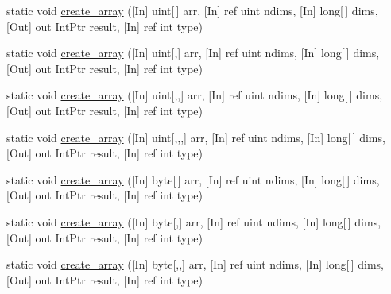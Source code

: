 \begin{DoxyCompactItemize}
\item 
static void \mbox{\hyperlink{classkhiva_1_1interop_1_1_d_l_l_array_ad44c8df121817c99bfd4b198a3634fc6}{create\+\_\+array}} (\mbox{[}In\mbox{]} uint\mbox{[}$\,$\mbox{]} arr, \mbox{[}In\mbox{]} ref uint ndims, \mbox{[}In\mbox{]} long\mbox{[}$\,$\mbox{]} dims, \mbox{[}Out\mbox{]} out Int\+Ptr result, \mbox{[}In\mbox{]} ref int type)
\item 
static void \mbox{\hyperlink{classkhiva_1_1interop_1_1_d_l_l_array_a64a55f5bfb3ad1a3a952d30d86101a7f}{create\+\_\+array}} (\mbox{[}In\mbox{]} uint\mbox{[},\mbox{]} arr, \mbox{[}In\mbox{]} ref uint ndims, \mbox{[}In\mbox{]} long\mbox{[}$\,$\mbox{]} dims, \mbox{[}Out\mbox{]} out Int\+Ptr result, \mbox{[}In\mbox{]} ref int type)
\item 
static void \mbox{\hyperlink{classkhiva_1_1interop_1_1_d_l_l_array_ab375d7195ded9e7835a23f548c1338be}{create\+\_\+array}} (\mbox{[}In\mbox{]} uint\mbox{[},,\mbox{]} arr, \mbox{[}In\mbox{]} ref uint ndims, \mbox{[}In\mbox{]} long\mbox{[}$\,$\mbox{]} dims, \mbox{[}Out\mbox{]} out Int\+Ptr result, \mbox{[}In\mbox{]} ref int type)
\item 
static void \mbox{\hyperlink{classkhiva_1_1interop_1_1_d_l_l_array_a5e309f5157241d17eba398f86a9abccc}{create\+\_\+array}} (\mbox{[}In\mbox{]} uint\mbox{[},,,\mbox{]} arr, \mbox{[}In\mbox{]} ref uint ndims, \mbox{[}In\mbox{]} long\mbox{[}$\,$\mbox{]} dims, \mbox{[}Out\mbox{]} out Int\+Ptr result, \mbox{[}In\mbox{]} ref int type)
\item 
static void \mbox{\hyperlink{classkhiva_1_1interop_1_1_d_l_l_array_abeb09bac96f36fd4554bfef73b24da11}{create\+\_\+array}} (\mbox{[}In\mbox{]} byte\mbox{[}$\,$\mbox{]} arr, \mbox{[}In\mbox{]} ref uint ndims, \mbox{[}In\mbox{]} long\mbox{[}$\,$\mbox{]} dims, \mbox{[}Out\mbox{]} out Int\+Ptr result, \mbox{[}In\mbox{]} ref int type)
\item 
static void \mbox{\hyperlink{classkhiva_1_1interop_1_1_d_l_l_array_a22615cf699595c8b74276e4eb6c7b4fc}{create\+\_\+array}} (\mbox{[}In\mbox{]} byte\mbox{[},\mbox{]} arr, \mbox{[}In\mbox{]} ref uint ndims, \mbox{[}In\mbox{]} long\mbox{[}$\,$\mbox{]} dims, \mbox{[}Out\mbox{]} out Int\+Ptr result, \mbox{[}In\mbox{]} ref int type)
\item 
static void \mbox{\hyperlink{classkhiva_1_1interop_1_1_d_l_l_array_a4b2bfac8b941b5ba24c92f1be6da1402}{create\+\_\+array}} (\mbox{[}In\mbox{]} byte\mbox{[},,\mbox{]} arr, \mbox{[}In\mbox{]} ref uint ndims, \mbox{[}In\mbox{]} long\mbox{[}$\,$\mbox{]} dims, \mbox{[}Out\mbox{]} out Int\+Ptr result, \mbox{[}In\mbox{]} ref int type)

\end{DoxyCompactItemize}
